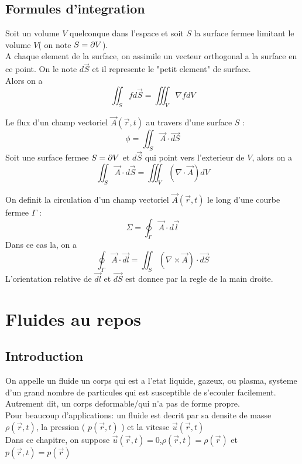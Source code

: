 \documentclass[../main.tex]{subfiles}
\begin{document}
\subsection{Formules d'integration}
\begin{thm}\label{thm:Theoreme du gradienttheoreme_du_gradient}
	Soit un volume $V$ quelconque dans l'espace et soit $S$ la surface fermee limitant le volume $V$( on note $S= \partial V$).\\
	A chaque element de la surface, on assimile un vecteur orthogonal a la surface en ce point. On le note $d \vec{S}$ et il represente le "petit element" de surface.\\
	Alors on a
	\[ 
	\iint_S f d \vec{S} = \iiint_V \nabla f dV
	\]
	
\end{thm}
	
\begin{thm}\label{thm:Theoreme de La divergence( de Gauss) theoreme_de_la_divergence_de_gauss_}
	Le flux d'un champ vectoriel $\vec{A}( \vec{r},t) $ au travers d'une surface $S$ :
	\[ 
	\phi = \iint_S \vec{A} \cdot \vec{dS}
	\]
	Soit une surface fermee $S= \partial V$ et $d \vec{S}$ qui point vers l'exterieur de $V$, alors on a
	\[ 
		\iint _S \vec{A} \cdot d \vec{S} = \iiint _V ( \nabla \cdot \vec{A}) dV
	\]
	
	
\end{thm}
\begin{thm}\label{thm:Theoreme de Stokestheoreme_de_stokes}
	On definit la circulation d'un champ vectoriel $\vec{A}( \vec{r},t) $ le long d'une courbe fermee $\Gamma$ :
\[ 
\Sigma = \oint_\Gamma \vec{A} \cdot d \vec{l}
\]
Dans ce cas la, on a
\[ 
	\oint_\Gamma \vec{A} \cdot \vec{dl} = \iint_S ( \nabla \times \vec{A}) \cdot \vec{dS}
\]
L'orientation relative de $\vec{dl}$ et $\vec{dS}$ est donnee par la regle de la main droite.


\end{thm}
\section{Fluides au repos}
\subsection{Introduction}
On appelle un fluide un corps qui est a l'etat liquide, gazeux, ou plasma, systeme d'un grand nombre de particules qui est susceptible de s'ecouler facilement.\\
Autrement dit, un corps deformable/qui n'a pas de forme propre.\\
Pour beaucoup d'applications: un fluide est decrit par sa densite de masse $\rho( \vec{r},t) $, la pression ( $p( \vec{r},t)$ ) et la vitesse $\vec{u}( \vec{r},t) $ \\
Dans ce chapitre, on suppose $\vec{u}( \vec{r},t) =0$,$\rho( \vec{r},t ) = \rho( \vec{r}) $ et $p( \vec{r},t) = p( \vec{r}) $ \\
\end{document}
